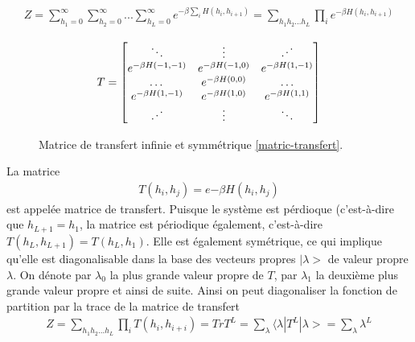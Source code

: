 \begin{align*}
 Z = \sum_{h_1=0}^\infty \sum_{h_2=0}^\infty ... \sum_{h_L=0}^\infty e^{- \beta \sum_{i} H(h_i,h_{i+1})}  
   = \sum_{h_1 h_2 ... h_L} \prod_{i} e^{-\beta H(h_i,h_{i+1})} 
\end{align*}

\begin{figure}
    \begin{align}
    T = \begin{bmatrix} 
            \ddots & \vdots & \reflectbox{$\ddots$} \\ 
            e^{-\beta H(-1,-1)} &  e^{-\beta H(-1,0)} & e^{-\beta H(1,-1)} \\
            \dots & e^{-\beta H(0,0)} & \dots  \\
            e^{-\beta H(1,-1)} & e^{-\beta H(1,0)} & e^{-\beta H(1,1)}   \\ 
             \reflectbox{$\ddots$} & \vdots &\ddots  \\ 
        \end{bmatrix}
    \end{align}
    \caption{Matrice de transfert infinie et symmétrique \ref{matric-transfert}.}
\end{figure}

La matrice 
\begin{align}
    T(h_i,h_j) = e{-\beta H(h_i,h_j)}
    \label{matric-transfert}
\end{align}
est appelée matrice de transfert. Puisque le système est pérdioque (c'est-à-dire que $h_{L+1} = h_1$,  la matrice est périodique également, c'est-à-dire $T(h_L,h_{L+1}) = T(h_L,h_1)$. Elle est également symétrique, ce qui implique qu'elle est diagonalisable dans la base des vecteurs propres $|\lambda >$ de valeur propre $\lambda$. On dénote par $\lambda_0$ la plus grande valeur propre de $T$, par $\lambda_1$ la deuxième plus grande valeur propre et ainsi de suite.
Ainsi on peut diagonaliser la fonction de partition par la trace de la matrice de transfert
\begin{align}
  Z = \sum_{h_1 h_2 ... h_L} \prod_{i} T(h_i,h_{i+i}) = Tr T^L  = \sum_\lambda \langle\lambda | T^L | \lambda> = \sum_\lambda \lambda^L
\end{align}

